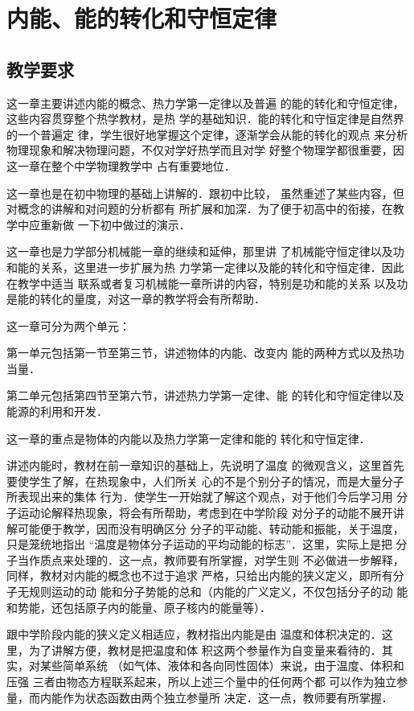 \chapter{内能、能的转化和守恒定律}
\minitoc[n]
\section{教学要求}
这一章主要讲述内能的概念、热力学第一定律以及普遍
的能的转化和守恒定律，这些内容贯穿整个热学教材，是热
学的基础知识．能的转化和守恒定律是自然界的一个普遍定
律，学生很好地掌握这个定律，逐渐学会从能的转化的观点
来分析物理现象和解决物理问题，不仅对学好热学而且对学
好整个物理学都很重要，因这一章在整个中学物理教学中
占有重要地位．

这一章也是在初中物理的基础上讲解的．跟初中比较，
虽然重述了某些内容，但对概念的讲解和对问题的分析都有
所扩展和加深．为了便于初高中的衔接，在教学中应重新做
一下初中做过的演示．

这一章也是力学部分机械能一章的继续和延伸，那里讲
了机械能守恒定律以及功和能的关系，这里进一步扩展为热
力学第一定律以及能的转化和守恒定律．因此在教学中适当
联系或者复习机械能一章所讲的内容，特别是功和能的关系
以及功是能的转化的量度，对这一章的教学将会有所帮助．

这一章可分为两个单元：

第一单元包括第一节至第三节，讲述物体的内能、改变内
能的两种方式以及热功当量．

第二单元包括第四节至第六节，讲述热力学第一定律、能
的转化和守恒定律以及能源的利用和开发．

这一章的重点是物体的内能以及热力学第一定律和能的
转化和守恒定律．

讲述内能时，教材在前一章知识的基础上，先说明了温度
的微观含义，这里首先要使学生了解，在热现象中，人们所关
心的不是个别分子的情况，而是大量分子所表现出来的集体
行为．使学生一开始就了解这个观点，对于他们今后学习用
分子运动论解释热现象，将会有所帮助，考虑到在中学阶段
对分子的动能不展开讲解可能便于教学，因而没有明确区分
分子的平动能、转动能和振能，关于温度，只是笼统地指出
“温度是物体分子运动的平均动能的标志”．这里，实际上是把
分子当作质点来处理的．这一点，教师要有所掌握，对学生则
不必做进一步解释，同样，教材对内能的概念也不过于追求
严格，只给出内能的狭义定义，即所有分子无规则运动的动
能和分子势能的总和（内能的广义定义，不仅包括分子的动
能和势能，还包括原子内的能量、原子核内的能量等）．

跟中学阶段内能的狭义定义相适应，教材指出内能是由
温度和体积决定的．这里，为了讲解方便，教材是把温度和体
积这两个参量作为自变量来看待的．其实，对某些简单系统
（如气体、液体和各向同性固体）来说，由于温度、体积和压强
三者由物态方程联系起来，所以上述三个量中的任何两个都
可以作为独立参量，而内能作为状态函数由两个独立参量所
决定．这一点，教师要有所掌握．

